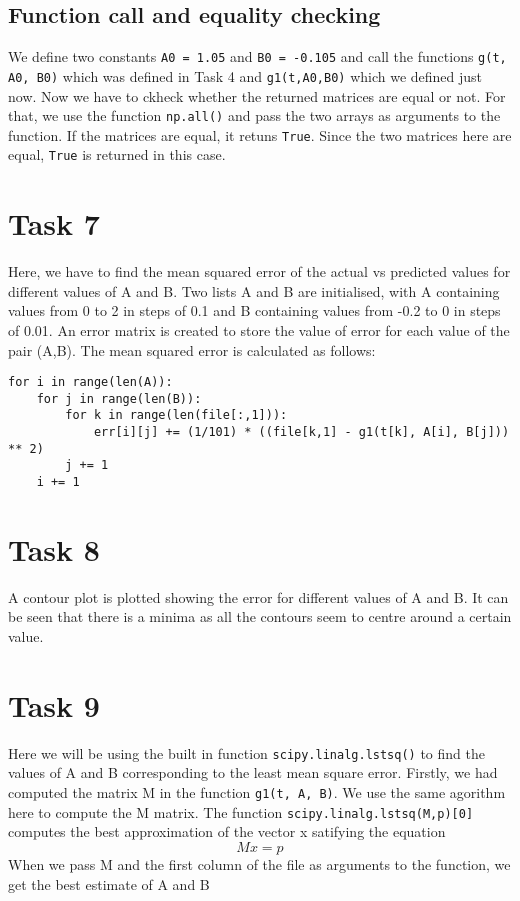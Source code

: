 \documentclass[11pt, a4paper]{article}
\begin{document}
\subsection{Function call and equality checking}
We define two constants \texttt{A0 = 1.05} and \texttt{B0 = -0.105} and call the functions \texttt{g(t, A0, B0)} which was defined in Task 4 and \texttt{g1(t,A0,B0)}  which we defined just now. Now we have to ckheck whether the returned matrices are equal or not. For that, we use the function \texttt{np.all()} and pass the two arrays as arguments to the function. If the matrices are equal, it retuns \texttt{True}. Since the two matrices here are equal, \texttt{True} is returned in this case.

\section{Task 7}
Here, we have to find the mean squared error of the actual vs predicted values for different values of A and B. Two lists A and B are initialised, with A containing values from 0 to 2 in steps of 0.1 and B containing values from -0.2 to 0 in steps of 0.01. An error matrix is created to store the value of error for each value of the pair (A,B). The mean squared error is calculated as follows:
\begin{verbatim}
for i in range(len(A)):
    for j in range(len(B)):
        for k in range(len(file[:,1])):
            err[i][j] += (1/101) * ((file[k,1] - g1(t[k], A[i], B[j])) ** 2) 
        j += 1
    i += 1
\end{verbatim}

\section{Task 8}
A contour plot is plotted showing the error for different values of A and B. It can be seen that there is a minima as all the contours seem to centre around a certain value.

\section{Task 9}
Here we will be using the built in function \texttt{scipy.linalg.lstsq()} to find the values of A and B corresponding to the least mean square error. Firstly, we
had computed the matrix M in the function \texttt{g1(t, A, B)}. We use the same agorithm here to compute the M matrix. The function \texttt{scipy.linalg.lstsq(M,p)[0]} computes the best approximation of the vector x satifying the equation
\begin{equation*}
Mx = p
\end{equation*}
When we pass M and the first column of the file as arguments to the function, we get the best estimate of A and B
\end{document}
